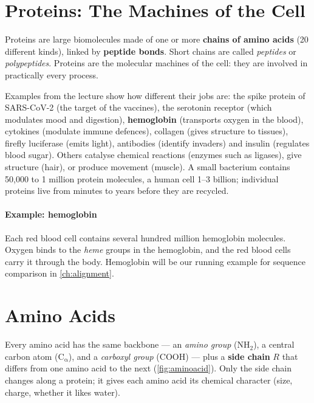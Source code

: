 \documentclass[11pt, oneside]{book}
\let\originalsection\section
\renewcommand{\section}{\Needspace{7\baselineskip}\originalsection}
\begin{document}
\section{Proteins: The Machines of the Cell}

\begin{defbox}[title={Protein}]
Proteins are large biomolecules made of one or more \textbf{chains of amino
acids} (20 different kinds), linked by \textbf{peptide bonds}. Short chains
are called \emph{peptides} or \emph{polypeptides}. Proteins are the molecular
machines of the cell: they are involved in practically every process.
\end{defbox}

Examples from the lecture show how different their jobs are: the spike
protein of SARS-CoV-2 (the target of the vaccines), the serotonin receptor
(which modulates mood and digestion), \textbf{hemoglobin} (transports oxygen
in the blood), cytokines (modulate immune defences), collagen (gives
structure to tissues), firefly luciferase (emits light), antibodies (identify
invaders) and insulin (regulates blood sugar). Others catalyse chemical
reactions (enzymes such as ligases), give structure (hair), or produce
movement (muscle). A small bacterium contains 50,000 to 1 million protein
molecules, a human cell 1--3 billion; individual proteins live from minutes
to years before they are recycled.

\paragraph{Example: hemoglobin}
Each red blood cell contains several hundred million hemoglobin molecules.
Oxygen binds to the \emph{heme} groups in the hemoglobin, and the red blood
cells carry it through the body. Hemoglobin will be our running example for
sequence comparison in \cref{ch:alignment}.

\section{Amino Acids}
\label{sec:aminoacids}

Every amino acid has the same backbone --- an \emph{amino group}
($\mathrm{NH_2}$), a central carbon atom ($\mathrm{C_\alpha}$), and a
\emph{carboxyl group} ($\mathrm{COOH}$) --- plus a \textbf{side chain}
$R$ that differs from one amino acid to the next (\cref{fig:aminoacid}).
Only the side chain changes along a protein; it gives each amino acid its
chemical character (size, charge, whether it likes water).
\end{document}
